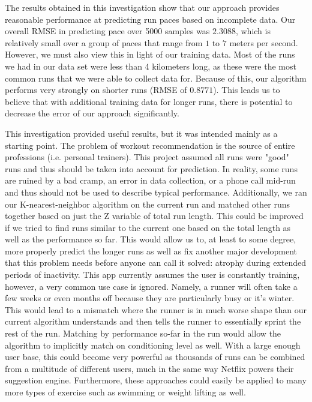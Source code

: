 \documentclass[twoside]{article}
\begin{document}
\begin{multicols}{2}
The results obtained in this investigation show that our approach provides reasonable performance at predicting run paces based on incomplete data. Our overall RMSE in predicting pace over 5000 samples was $2.3088$, which is relatively small over a group of paces that range from $1$ to $7$ meters per second. However, we must also view this in light of our training data. Most of the runs we had in our data set were less than 4 kilometers long, as these were the most common runs that we were able to collect data for. Because of this, our algorithm performs very strongly on shorter runs (RMSE of $0.8771$). This leads us to believe that with additional training data for longer runs, there is potential to decrease the error of our approach significantly.

	This investigation provided useful results, but it was intended mainly as a starting point. The problem of workout recommendation is the source of entire professions (i.e. personal trainers). This project assumed all runs were "good" runs and thus should be taken into account for prediction. In reality, some runs are ruined by a bad cramp, an error in data collection, or a phone call mid-run and thus should not be used to describe typical performance. Additionally, we ran our K-nearest-neighbor algorithm on the current run and matched other runs together based on just the Z variable of total run length. This could be improved if we tried to find runs similar to the current one based on the total length as well as the performance so far. This would allow us to, at least to some degree, more properly predict the longer runs as well as fix another major development that this problem needs before anyone can call it solved: atrophy during extended periods of inactivity. This app currently assumes the user is constantly training, however, a very common use case is ignored. Namely, a runner will often take a few weeks or even months off because they are particularly busy or it's winter. This would lead to a mismatch where the runner is in much worse shape than our current algorithm understands and then tells the runner to essentially sprint the rest of the run. Matching by performance so-far in the run would allow the algorithm to implicitly match on conditioning level as well. With a large enough user base, this could become very powerful as thousands of runs can be combined from a multitude of different users, much in the same way Netflix powers their suggestion engine. Furthermore, these approaches could easily be applied to many more types of exercise such as swimming or weight lifting as well. \\
	

\end{multicols}
\end{document}
